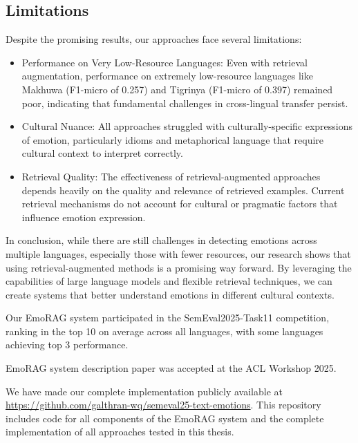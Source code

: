 \documentclass[a4paper,12pt]{extarticle}
\begin{document}
\subsection{Limitations}

Despite the promising results, our approaches face several limitations:

\begin{itemize}
    \item Performance on Very Low-Resource Languages: Even with retrieval augmentation, performance on extremely low-resource languages like Makhuwa (F1-micro of 0.257) and Tigrinya (F1-micro of 0.397) remained poor, indicating that fundamental challenges in cross-lingual transfer persist.
    
    \item Cultural Nuance: All approaches struggled with culturally-specific expressions of emotion, particularly idioms and metaphorical language that require cultural context to interpret correctly.
    
    \item Retrieval Quality: The effectiveness of retrieval-augmented approaches depends heavily on the quality and relevance of retrieved examples. Current retrieval mechanisms do not account for cultural or pragmatic factors that influence emotion expression.
    
\end{itemize}


In conclusion, while there are still challenges in detecting emotions across multiple languages, especially those with fewer resources, our research shows that using retrieval-augmented methods is a promising way forward. By leveraging the capabilities of large language models and flexible retrieval techniques, we can create systems that better understand emotions in different cultural contexts.

Our EmoRAG system participated in the SemEval2025-Task11 competition, ranking in the top 10 on average across all languages, with some languages achieving top 3 performance. 

EmoRAG system description paper was accepted at the ACL Workshop 2025.

We have made our complete implementation publicly available at \url{https://github.com/galthran-wq/semeval25-text-emotions}. This repository includes code for all components of the EmoRAG system and the complete implementation of all approaches tested in this thesis.

\printbibliography
\end{document}
